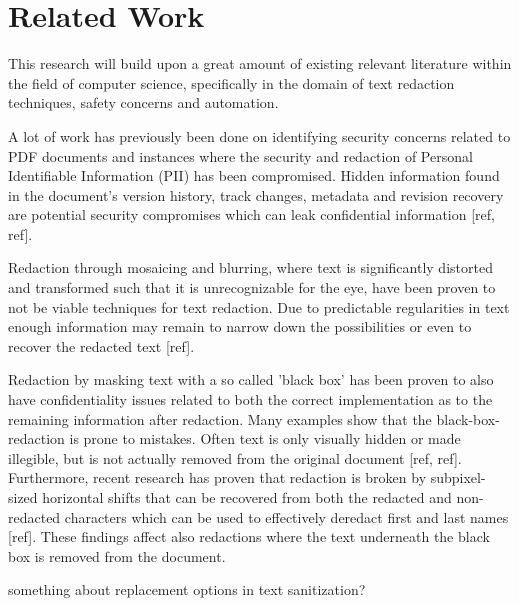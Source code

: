 \section{Related Work}
\label{sec:related_work}

This research will build upon a great amount of existing relevant literature within the field of computer science, specifically in the domain of text redaction techniques, safety concerns and automation. 

A lot of work has previously been done on identifying security concerns related to PDF documents and instances where the security and redaction of Personal Identifiable Information (PII) has been compromised. Hidden information found in the document's version history, track changes, metadata and revision recovery are potential security compromises which can leak confidential information [ref, ref].

Redaction through mosaicing and blurring, where text is significantly distorted and transformed such that it is unrecognizable for the eye, have been proven to not be viable techniques for text redaction. Due to predictable regularities in text enough information may remain to narrow down the possibilities or even to recover the redacted text [ref]. 

Redaction by masking text with a so called 'black box' has been proven to also have confidentiality issues related to both the correct implementation as to the remaining information after redaction. Many examples show that the black-box-redaction is prone to mistakes. Often text is only visually hidden or made illegible, but is not actually removed from the original document [ref, ref]. Furthermore, recent research has proven that redaction is broken by subpixel-sized horizontal shifts that can be recovered from both the redacted and non-redacted characters which can be used to effectively deredact first and last names [ref]. These findings affect also redactions where the text underneath the black box is removed from the document. 

something about replacement options in text sanitization?



